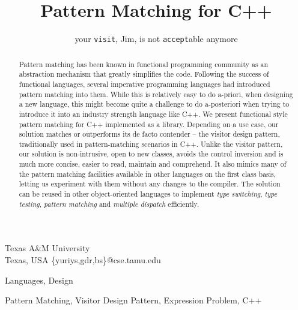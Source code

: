 \documentclass[preprint]{sigplanconf}
\makeatletter
\DeclareRobustCommand{\code}[1]{{\lstinline[breaklines=false,escapechar=@]{#1}}}
\makeatother
\begin{document}


\title{Pattern Matching for C++}
\subtitle{your \code{visit}, Jim, is not \code{accept}able anymore}

           {Texas A\&M University\\ Texas, USA}
           {\{yuriys,gdr,bs\}@cse.tamu.edu}

\maketitle

\begin{abstract}
Pattern matching has been known in functional programming community as an 
abstraction mechanism that greatly simplifies the code. Following the success of 
functional languages, several imperative programming languages had introduced 
pattern matching into them. While this is relatively easy to do a-priori, when 
designing a new language, this might become quite a challenge to do a-posteriori 
when trying to introduce it into an industry strength language like C++. We 
present functional style pattern matching for C++ implemented as a library. 
Depending on a use case, our solution matches or outperforms its de facto 
contender -- the visitor design pattern, traditionally used in pattern-matching 
scenarios in C++. Unlike the visitor pattern, our solution is non-intrusive, 
open to new classes, avoids the control inversion and is much more concise, 
easier to read, maintain and comprehend. It also mimics many of the pattern 
matching facilities available in other languages on the first class basis, 
letting us experiment with them without any changes to the compiler. The 
solution can be reused in other object-oriented languages to implement
\emph{type switching}, \emph{type testing}, \emph{pattern matching} and 
\emph{multiple dispatch} efficiently.
\end{abstract}


\terms
Languages, Design

\keywords
Pattern Matching, Visitor Design Pattern, Expression Problem, C++
\end{document}
